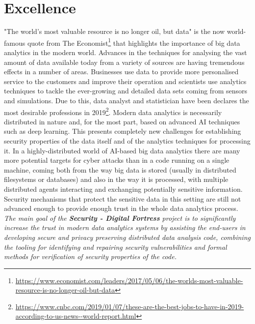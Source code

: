 \documentclass[a4paper,11pt]{article}
\newcommand{\project}[1]{\textbf{#1}\xspace}
\newcommand{\SECURITY}{\project{Security - Digital Fortress}}
\newcommand{\TheProject}{\SECURITY}
\begin{document}




\section{Excellence}
"The world's most valuable resource is no longer oil, but data" is the now world-famous quote from The Economist\footnote{\url{https://www.economist.com/leaders/2017/05/06/the-worlds-most-valuable-resource-is-no-longer-oil-but-data}} that highlights the importance of big data analytics in the modern world. Advances in the techniques for analysing the vast amount of data available today from a variety of sources are having tremendous effects in a number of areas. Businesses use data to provide more personalised service to the customers and improve their operation and scientists use analytics techniques to tackle the ever-growing and detailed data sets coming from sensors and simulations. Due to this, data analyst and statistician have been declares the most desirable professions in 2019\footnote{\url{https://www.cnbc.com/2019/01/07/these-are-the-best-jobs-to-have-in-2019-according-to-us-news--world-report.html}}. Modern data analytics is necessarily distributed in nature and, for the most part, based on advanced AI techniques such as deep learning.  This presents completely new challenges for establishing security properties of the data itself and of the analytics techniques for processing it. In a highly-distributed world of AI-based big data analytics there are many more potential targets for cyber attacks than in a code running on a single machine, coming both from the way big data is stored (usually in distributed filesystems or databases) and also in the way it is processed, with multiple distributed agents interacting and exchanging potentially sensitive information. Security mechanisms that protect the sensitive data in this setting are still not advanced enough to provide enough trust in the whole data analytics process. \emph{The main goal of the \TheProject{} project is to significantly increase the trust in modern data analytics systems by assisting the end-users in developing secure and privacy preserving distributed data analysis code, combining the tooling for identifying and repairing security vulnerabilities and formal methods for verification of security properties of the code.}
\end{document}
